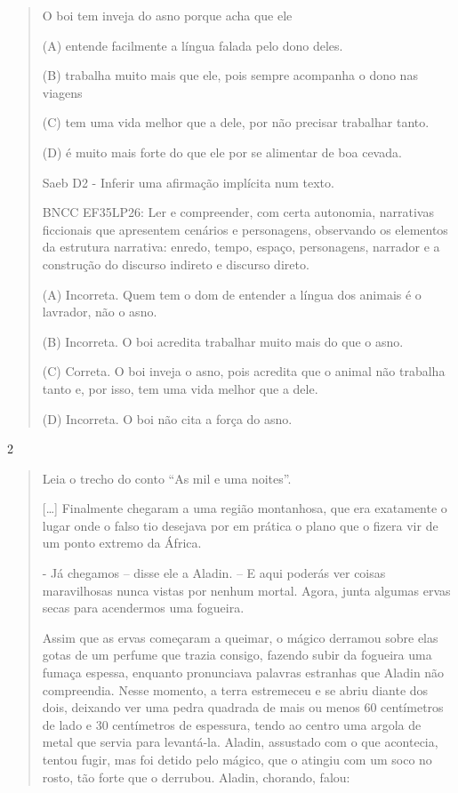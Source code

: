 \begin{itemize}
{{{\begin{itemize}
\begin{itemize}
\begin{itemize}
\begin{quote}
O boi tem inveja do asno porque acha que ele

(A) entende facilmente a língua falada pelo dono deles.

(B) trabalha muito mais que ele, pois sempre acompanha o dono nas
viagens

(C) tem uma vida melhor que a dele, por não precisar trabalhar tanto.

(D) é muito mais forte do que ele por se alimentar de boa cevada.

Saeb D2 - Inferir uma afirmação implícita num texto.

BNCC EF35LP26: Ler e compreender, com certa autonomia, narrativas
ficcionais que apresentem cenários e personagens, observando os
elementos da estrutura narrativa: enredo, tempo, espaço, personagens,
narrador e a construção do discurso indireto e discurso direto.

(A) Incorreta. Quem tem o dom de entender a língua dos animais é o
lavrador, não o asno.

(B) Incorreta. O boi acredita trabalhar muito mais do que o asno.

(C) Correta. O boi inveja o asno, pois acredita que o animal não
trabalha tanto e, por isso, tem uma vida melhor que a dele.

(D) Incorreta. O boi não cita a força do asno.
\end{quote}

\num{2}

\begin{quote}
Leia o trecho do conto ``As mil e uma noites''.

{[}\ldots{}{]} Finalmente chegaram a uma região montanhosa, que era
exatamente o lugar onde o falso tio desejava por em prática o plano que
o fizera vir de um ponto extremo da África.

- Já chegamos -- disse ele a Aladin. -- E aqui poderás ver coisas
maravilhosas nunca vistas por nenhum mortal. Agora, junta algumas ervas
secas para acendermos uma fogueira.

Assim que as ervas começaram a queimar, o mágico derramou sobre elas
gotas de um perfume que trazia consigo, fazendo subir da fogueira uma
fumaça espessa, enquanto pronunciava palavras estranhas que Aladin não
compreendia. Nesse momento, a terra estremeceu e se abriu diante dos
dois, deixando ver uma pedra quadrada de mais ou menos 60 centímetros de
lado e 30 centímetros de espessura, tendo ao centro uma argola de metal
que servia para levantá-la. Aladin, assustado com o que acontecia,
tentou fugir, mas foi detido pelo mágico, que o atingiu com um soco no
rosto, tão forte que o derrubou. Aladin, chorando, falou:


\end{quote}
\end{itemize}
\end{itemize}
\end{itemize}}}}
\end{itemize}
